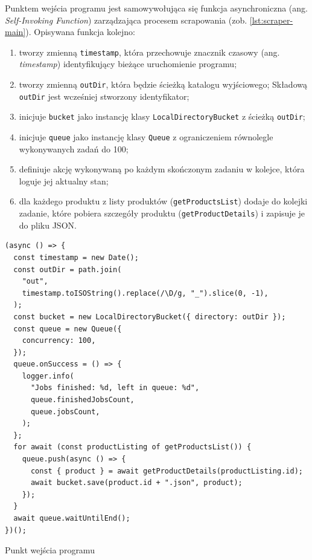 Punktem wejścia programu jest samowywołująca się funkcja asynchroniczna (ang. \emph{Self-Invoking Function}) zarządzająca procesem scrapowania (zob. \autoref{lst:scraper-main}).
Opisywana funkcja kolejno:
\begin{enumerate}
    \item tworzy zmienną \texttt{timestamp}, która przechowuje znacznik czasowy (ang. \emph{timestamp}) identyfikujący bieżące uruchomienie programu;
    \item tworzy zmienną \texttt{outDir}, która będzie ścieżką katalogu wyjściowego;
    Składową \texttt{outDir} jest wcześniej stworzony identyfikator;
    \item inicjuje \texttt{bucket} jako instancję klasy \texttt{LocalDirectoryBucket} z ścieżką \texttt{outDir};
    \item inicjuje \texttt{queue} jako instancję klasy \texttt{Queue} z ograniczeniem równolegle wykonywanych zadań do 100;
    \item definiuje akcję wykonywaną po każdym skończonym zadaniu w kolejce, która loguje jej aktualny stan;
    \item dla każdego produktu z listy produktów (\texttt{getProductsList}) dodaje do kolejki zadanie, które
    pobiera szczegóły produktu (\texttt{getProductDetails}) i zapisuje je do pliku JSON\@.
\end{enumerate}

\begin{listing}[H]
    \begin{verbatim}
(async () => {
  const timestamp = new Date();
  const outDir = path.join(
    "out",
    timestamp.toISOString().replace(/\D/g, "_").slice(0, -1),
  );
  const bucket = new LocalDirectoryBucket({ directory: outDir });
  const queue = new Queue({
    concurrency: 100,
  });
  queue.onSuccess = () => {
    logger.info(
      "Jobs finished: %d, left in queue: %d",
      queue.finishedJobsCount,
      queue.jobsCount,
    );
  };
  for await (const productListing of getProductsList()) {
    queue.push(async () => {
      const { product } = await getProductDetails(productListing.id);
      await bucket.save(product.id + ".json", product);
    });
  }
  await queue.waitUntilEnd();
})();
    \end{verbatim}
    \caption{Punkt wejścia programu}
    \label{lst:scraper-main}
\end{listing}

